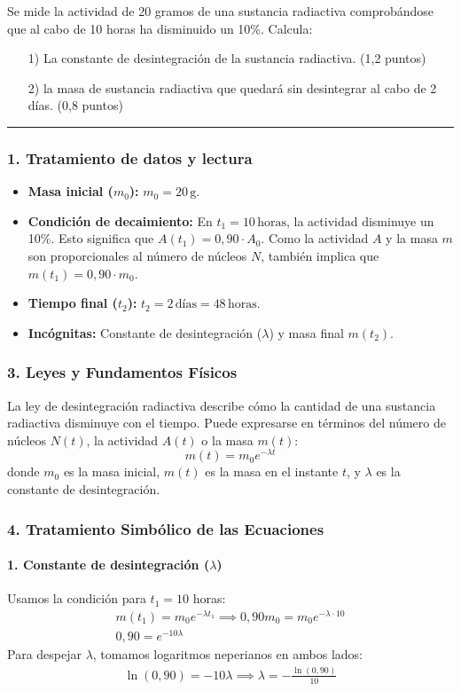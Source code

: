 \begin{cajaenunciado}
Se mide la actividad de 20 gramos de una sustancia radiactiva comprobándose que al cabo de 10 horas ha disminuido un 10\%. Calcula:
\begin{enumerate}
    \item[1)] La constante de desintegración de la sustancia radiactiva. (1,2 puntos)
    \item[2)] la masa de sustancia radiactiva que quedará sin desintegrar al cabo de 2 días. (0,8 puntos)
\end{enumerate}
\end{cajaenunciado}
\hrule

\subsubsection*{1. Tratamiento de datos y lectura}
\begin{itemize}
    \item \textbf{Masa inicial ($m_0$):} $m_0 = 20 \, \text{g}$.
    \item \textbf{Condición de decaimiento:} En $t_1 = 10 \, \text{horas}$, la actividad disminuye un 10\%. Esto significa que $A(t_1) = 0,90 \cdot A_0$. Como la actividad $A$ y la masa $m$ son proporcionales al número de núcleos $N$, también implica que $m(t_1) = 0,90 \cdot m_0$.
    \item \textbf{Tiempo final ($t_2$):} $t_2 = 2 \, \text{días} = 48 \, \text{horas}$.
    \item \textbf{Incógnitas:} Constante de desintegración ($\lambda$) y masa final $m(t_2)$.
\end{itemize}

\subsubsection*{3. Leyes y Fundamentos Físicos}
La ley de desintegración radiactiva describe cómo la cantidad de una sustancia radiactiva disminuye con el tiempo. Puede expresarse en términos del número de núcleos $N(t)$, la actividad $A(t)$ o la masa $m(t)$:
$$ m(t) = m_0 e^{-\lambda t} $$
donde $m_0$ es la masa inicial, $m(t)$ es la masa en el instante $t$, y $\lambda$ es la constante de desintegración.

\subsubsection*{4. Tratamiento Simbólico de las Ecuaciones}
\paragraph{1. Constante de desintegración ($\lambda$)}
Usamos la condición para $t_1=10$ horas:
\begin{gather}
    m(t_1) = m_0 e^{-\lambda t_1} \implies 0,90 m_0 = m_0 e^{-\lambda \cdot 10} \\
    0,90 = e^{-10\lambda}
\end{gather}
Para despejar $\lambda$, tomamos logaritmos neperianos en ambos lados:
\begin{gather}
    \ln(0,90) = -10\lambda \implies \lambda = -\frac{\ln(0,90)}{10}
\end{gather}
